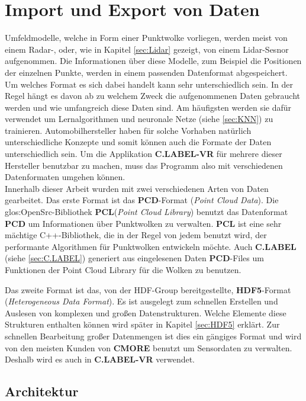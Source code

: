 \section{Import und Export von Daten}
\label{sec:ImportExport}
Umfeldmodelle, welche in Form einer Punktwolke vorliegen, werden meist von einem Radar-, oder, wie in Kapitel \ref{sec:Lidar} gezeigt, von einem Lidar-Sesnor aufgenommen. Die Informationen über diese Modelle, zum Beispiel die Positionen der einzelnen Punkte, werden in einem passenden Datenformat abgespeichert. Um welches Format es sich dabei handelt kann sehr unterschiedlich sein. In der Regel hängt es davon ab zu welchem Zweck die aufgenommenen Daten gebraucht werden und wie umfangreich diese Daten sind. Am häufigsten werden sie dafür verwendet um Lernalgorithmen und neuronale Netze (siehe \ref{sec:KNN}) zu trainieren. Automobilhersteller haben für solche Vorhaben natürlich unterschiedliche Konzepte und somit können auch die Formate der Daten unterschiedlich sein. Um die Applikation \textbf{C.LABEL-VR} für mehrere dieser Hersteller benutzbar zu machen, muss das Programm also mit verschiedenen Datenformaten umgehen können.\\ 

Innerhalb dieser Arbeit wurden mit zwei verschiedenen Arten von Daten gearbeitet. Das erste Format ist das \textbf{PCD}-Format (\textit{Point Cloud Data}). Die \gls{glos:OpenSrc}-Bibliothek \textbf{PCL}(\textit{Point Cloud Library}) benutzt das Datenformat \textbf{PCD} um Informationen über Punktwolken zu verwalten. \textbf{PCL} ist eine sehr mächtige C++-Bibliothek, die in der Regel von jedem benutzt wird, der performante Algorithmen für Punktwolken entwickeln möchte. Auch \textbf{C.LABEL} (siehe \ref{sec:C.LABEL}) generiert aus eingelesenen Daten \textbf{PCD}-Files um Funktionen der Point Cloud Library für die Wolken zu benutzen.

Das zweite Format ist das, von der HDF-Group bereitgestellte, \textbf{HDF5}-Format (\textit{Heterogeneous Data Format}). Es ist ausgelegt zum schnellen Erstellen und Auslesen von komplexen und großen Datenstrukturen. Welche Elemente diese Strukturen enthalten können wird später in Kapitel \ref{sec:HDF5} erklärt. Zur schnellen Bearbeitung großer Datenmengen ist dies ein gängiges Format und wird von den meisten Kunden von \textbf{CMORE} benutzt um Sensordaten zu verwalten. Deshalb wird es auch in \textbf{C.LABEL-VR} verwendet.\\

\subsection{Architektur}


